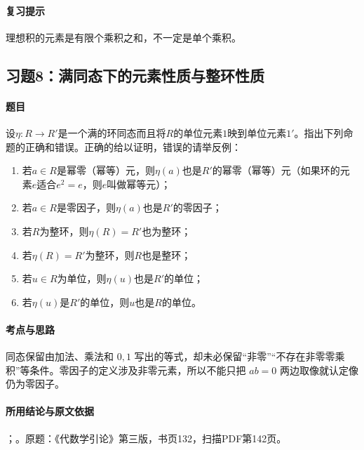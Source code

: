 \paragraph{复习提示}

理想积的元素是有限个乘积之和，不一定是单个乘积。



\subsection{习题8：满同态下的元素性质与整环性质}

\label{ex:3:8}

\paragraph{题目}

设$\eta:R\to R'$是一个满的环同态而且将$R$的单位元素$1$映到单位元素$1'$。指出下列命题的正确和错误。正确的给以证明，错误的请举反例：
\begin{enumerate}[label=(\roman*)]
\item 若$a\in R$是幂零（幂等）元，则$\eta(a)$也是$R'$的幂零（幂等）元（如果环的元素$e$适合$e^2=e$，则$e$叫做幂等元）；
\item 若$a\in R$是零因子，则$\eta(a)$也是$R'$的零因子；
\item 若$R$为整环，则$\eta(R)=R'$也为整环；
\item 若$\eta(R)=R'$为整环，则$R$也是整环；
\item 若$u\in R$为单位，则$\eta(u)$也是$R'$的单位；
\item 若$\eta(u)$是$R'$的单位，则$u$也是$R$的单位。
\end{enumerate}

\paragraph{考点与思路}

同态保留由加法、乘法和 $0,1$ 写出的等式，却未必保留“非零”“不存在非零零乘积”等条件。零因子的定义涉及非零元素，所以不能只把 $ab=0$ 两边取像就认定像仍为零因子。

\paragraph{所用结论与原文依据}

；。原题：《代数学引论》第三版，书页132，扫描PDF第142页。


